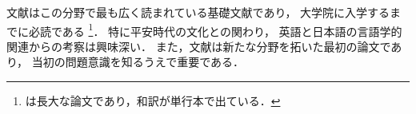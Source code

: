 \documentclass[lualatex,ja=standard,magstyle=real,12pt]{bxjsarticle}
\begin{document}
文献\autocite{hoge2000,foobar1990}はこの分野で最も広く読まれている基礎文献であり，
大学院に入学するまでに必読である
\footnote{\cite{foobar1990}は長大な論文であり，和訳が単行本で出ている\cite{foobar1995}．}．
特に平安時代の文化との関わり\autocite[25]{hoge2000}，
英語と日本語の言語学的関連からの考察\autocite[30--35]{hoge2000}は興味深い．
また，文献\autocite{hoge2001}は新たな分野を拓いた最初の論文であり，
当初の問題意識を知るうえで重要である．
\printbibliography
\end{document}
